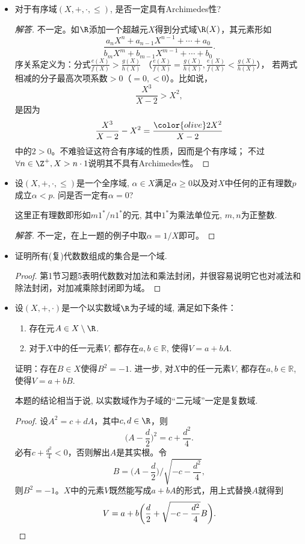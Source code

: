 \begin{3b}
\begin{itemize}
\item[1.] 对于有序域\((X,+,\cdot,\leqslant)\), 是否一定具有Archimedes性?
\begin{proof}[解答]
    不一定。如$\R$添加一个超越元$X$得到分式域$\R(X)$，其元素形如
    \[\frac{a_nX^n+a_{n-1}X^{n-1}+\cdots+a_0}{b_mX^m+b_{m-1}X^{m-1}+\cdots+b_0}.\]
    序关系定义为：分式\(\frac{e(X)}{f(X)}>\frac{g(X)}{h(X)}\)
    （\(\frac{e(X)}{f(X)}=\frac{g(X)}{h(X)},\frac{e(X)}{f(X)}<\frac{g(X)}{h(X)}\)），
    若两式相减的分子最高次项系数$>0$（$=0,<0$）。比如说，
    \[\frac{X^3}{X-2}>X^2,\]
    是因为\[\frac{X^3}{X-2}-X^2=\frac{{\color{olive}2}X^2}{X-2}\]
    中的$2>0$。不难验证这符合有序域的性质，因而是个有序域；
    不过$\forall n\in\Z^+,X>n\cdot1$说明其不具有Archimedes性。
\end{proof}
\item[2.] 设\((X,+,\cdot,\leqslant)\)是一个全序域, \(\alpha\in X\)满足\(\alpha\geqslant 0\)以及对\(X\)中任何的正有理数\(p\)成立\(\alpha<p\). 问是否一定有\(\alpha=0\)?

这里正有理数即形如\(m1^*/n1^*\)的元, 其中\(1^*\)为乘法单位元, \(m,n\)为正整数.
\begin{proof}[解答]
    不一定，在上一题的例子中取$\alpha=1/X$即可。
\end{proof}
\item[3.] 证明所有(复)代数数组成的集合是一个域.
\begin{proof}
第1节习题5表明代数数对加法和乘法封闭，并很容易说明它也对减法和除法封闭，对加减乘除封闭即为域。
\end{proof}
\item[4.] 设\((X,+,\cdot)\)是一个以实数域\(\R\)为子域的域, 满足如下条件：
\begin{enumerate}[label=(\roman*)]
\item 存在元\(A\in X\setminus\R\).
\item 对于\(X\)中的任一元素\(V\), 都存在\(a,b\in \mathbb{R}\), 使得\(V=a+bA\).
\end{enumerate}
证明：存在\(B\in X\)使得\(B^2=-1\). 进一步, 对\(X\)中的任一元素\(V\), 
都存在\(a,b\in \mathbb{R}\), 使得\(V=a+bB\).

本题的结论相当于说, 以实数域作为子域的``二元域''一定是复数域.
\begin{proof}
    设$A^2=c+dA$，其中$c,d\in\R$，则
    \[\Big(A-\frac{d}{2}\Big)^2=c+\frac{d^2}{4}.\]
    必有$c+\frac{d^2}{4}<0$，否则解出$A$是其实根。令
    \[B=\Big(A-\frac{d}{2}\Big)\Big/\sqrt{-c-\frac{d^2}{4}},\]
    则$B^2=-1$。$X$中的元素$V$既然能写成$a+bA$的形式，用上式替换$A$就得到
    \[V=a+b\bigg(\frac{d}{2}+\sqrt{-c-\frac{d^2}{4}}B\bigg).\qedhere\]
\end{proof}


\end{itemize}
\end{3b}
